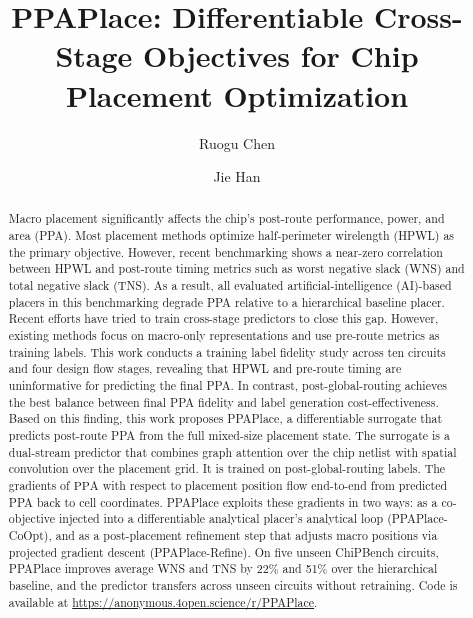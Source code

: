 \documentclass[sigconf,anonymous,review,9pt]{acmart}
\begin{document}
\title{PPAPlace: Differentiable Cross-Stage Objectives for Chip Placement Optimization}

\author{Ruogu Chen}

\author{Jie Han}

\begin{abstract}
Macro placement significantly affects the chip's post-route performance,
power, and area (PPA). Most placement methods optimize half-perimeter wirelength
(HPWL) as the primary objective. However, recent benchmarking shows a near-zero correlation between HPWL and post-route timing metrics such as worst negative slack (WNS) and total negative slack (TNS). As a result, all evaluated artificial-intelligence (AI)-based placers in this benchmarking degrade PPA relative to a hierarchical baseline placer. Recent efforts have tried to train cross-stage predictors to close this gap. However, existing methods focus on macro-only representations and use pre-route metrics as training labels. This work conducts a training label fidelity study across ten circuits and four design flow stages, revealing that HPWL and pre-route timing are uninformative for predicting the final PPA. In contrast, post-global-routing achieves the best balance between final PPA fidelity and label generation cost-effectiveness. Based on this finding, this work proposes PPAPlace, a differentiable surrogate that predicts post-route PPA from the full mixed-size placement state. The surrogate is a dual-stream predictor that combines graph attention over the chip netlist with spatial convolution over the placement grid. It is trained on post-global-routing labels. The gradients of $\text{PPA}$ with respect to placement $\text{position}$ flow end-to-end from predicted PPA back to cell coordinates. PPAPlace exploits these gradients in two ways: as a co-objective injected into a differentiable analytical placer's analytical loop (PPAPlace-CoOpt), and as a post-placement refinement
step that adjusts macro positions via projected gradient descent (PPAPlace-Refine). On five unseen ChiPBench circuits, PPAPlace improves average WNS and TNS by 22\% and 51\% over the hierarchical baseline, and the predictor transfers across unseen circuits without retraining. Code is available at \url{https://anonymous.4open.science/r/PPAPlace}.
\end{abstract}
\end{document}
